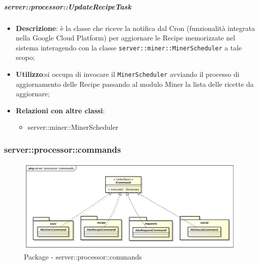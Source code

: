     \subparagraph{server::processor::UpdateRecipeTask} %
    \label{subp:bdsm_app_server_processor_updaterecipetask}
    \begin{itemize}
      \item \textbf{Descrizione}: è la classe che riceve la notifica dal Cron (funzionalità integrata nella Google Cloud Platform) per aggiornare le Recipe memorizzate nel sistema interagendo con la classe \texttt{server::miner::MinerScheduler} a tale scopo;
      \item \textbf{Utilizzo}:si occupa di invocare il \texttt{MinerScheduler} avviando il processo di aggiornamento delle Recipe passando al modulo Miner la lista delle ricette da aggiornare;
      \item \textbf{Relazioni con altre classi}:
        \begin{itemize}
          \item server::miner::MinerScheduler
        \end{itemize}
    \end{itemize}


    \subsubsection{server::processor::commands} %
    \label{ssub:bdsm_app_server_processor_commands}
    \begin{figure}[!htbp]
    	\centering
    	\centerline{\includegraphics[scale=0.4]{./images/server/commands.pdf}}
    	\caption{Package - server::processor::commands}
    \end{figure}

